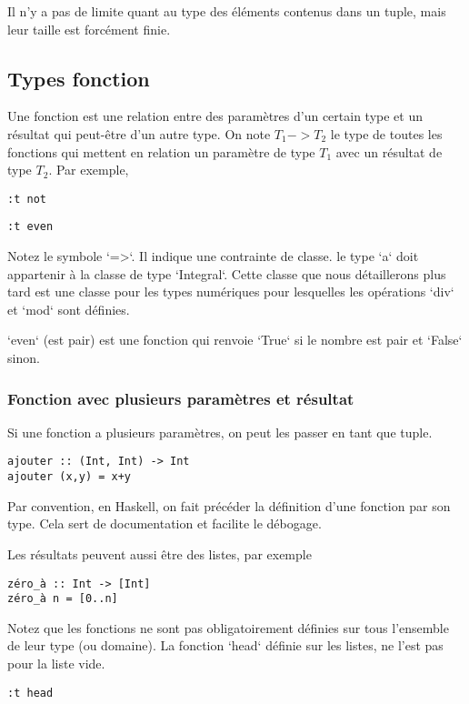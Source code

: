 \documentclass[11pt]{article}
\begin{document}
Il n'y a pas de limite quant au type des éléments contenus dans un tuple, mais leur taille est forcément finie.


\subsection{Types fonction}
\label{sec:orgc74ee0b}
Une fonction est une relation entre des paramètres d'un certain type et un résultat qui peut-être d'un autre type.   On note \(T_1 -> T_2\)  le type de toutes les fonctions qui mettent en relation  un paramètre de type \(T_1\)  avec un résultat de type \(T_2\).   Par exemple,
\begin{verbatim}
:t not 
\end{verbatim}

\begin{verbatim}
:t even
\end{verbatim}

Notez le symbole `=>`.  Il indique une contrainte de classe.   le type `a`  doit appartenir à la classe de type `Integral`.  Cette classe que nous détaillerons plus tard est une classe pour les types numériques pour lesquelles les opérations  `div` et `mod` sont définies.

`even` (est pair) est une fonction qui renvoie `True` si le nombre est pair et `False` sinon.    

\subsubsection{Fonction avec plusieurs paramètres et résultat}
\label{sec:org70a34fb}
Si une fonction a plusieurs paramètres, on peut les passer en tant que tuple.  

\begin{verbatim}
ajouter :: (Int, Int) -> Int
ajouter (x,y) = x+y
\end{verbatim}
Par convention, en Haskell, on fait précéder la définition d'une fonction par son type.   Cela sert de documentation et facilite le débogage.

Les résultats peuvent aussi être des listes, par exemple
\begin{verbatim}
zéro_à :: Int -> [Int]
zéro_à n = [0..n]
\end{verbatim}

Notez que les fonctions ne sont pas obligatoirement définies sur tous l'ensemble de leur type (ou domaine).    La fonction `head` définie sur les listes,  ne l'est pas pour la liste vide.
\begin{verbatim}
:t head
\end{verbatim}
\end{document}
